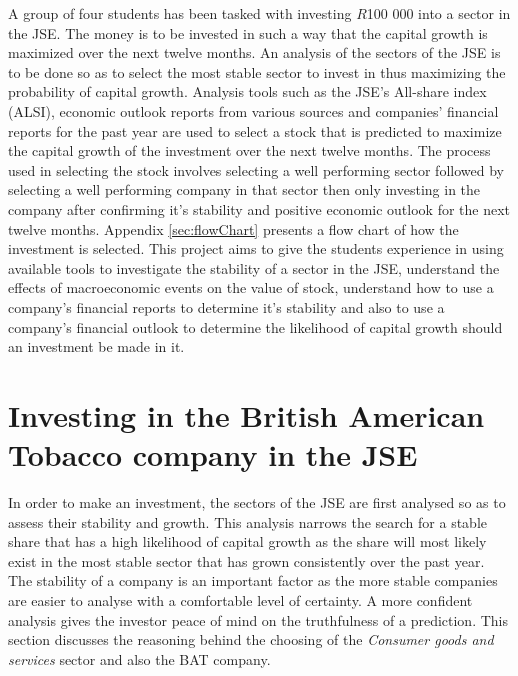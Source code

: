 \documentclass[letterpaper, 10 pt, conference]{ieeeconf}  %
\begin{document}
A group of four students has been tasked with investing $R$100 000 into a sector in the JSE. The money is to be invested in such a way that the capital growth is maximized over the next twelve months. An analysis of the sectors of the JSE is to be done so as to select the most stable sector to invest in thus maximizing the probability of capital growth. Analysis tools such as the JSE's All-share index (ALSI), economic outlook reports from various sources and companies' financial reports for the past year are used to select a stock that is predicted to maximize the capital growth of the investment over the next twelve months. The process used in selecting the stock involves selecting a well performing sector followed by selecting a well performing company in that sector then only investing in the company after confirming it's stability and positive economic outlook for the next twelve months. Appendix \ref{sec:flowChart} presents a flow chart of how the investment is selected. This project aims to give the students experience in using available tools to investigate the stability of a sector in the JSE, understand the effects of macroeconomic events on the value of stock, understand how to use a company's financial reports to determine it's stability and also to use a company's financial outlook to determine the likelihood of capital growth should an investment be made in it. 

\section{Investing in the British American Tobacco company in the JSE}

In order to make an investment, the sectors of the JSE are first analysed so as to assess their stability and growth. This analysis narrows the search for a stable share that has a high likelihood of capital growth as the share will most likely exist in the most stable sector that has grown consistently over the past year. The stability of a company is an important factor as the more stable companies are easier to analyse with a comfortable level of certainty. A more confident analysis gives the investor peace of mind on the truthfulness of a prediction. This section discusses the reasoning behind the choosing of the \textit{Consumer goods and services} sector and also the BAT company.
\end{document}
